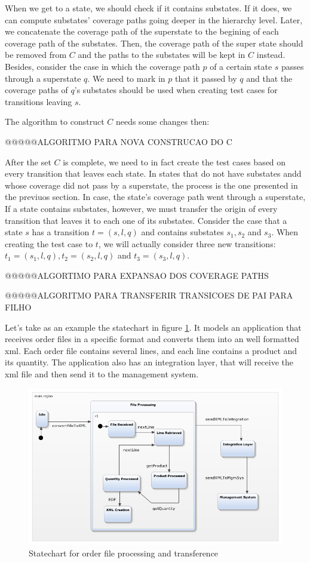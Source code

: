 When we get to a state, we should check if it contains substates. If it does, we can compute substates' coverage paths going deeper in the hierarchy level. Later, we concatenate the coverage path of the superstate to the begining of each coverage path of the substates. Then, the coverage path of the super state should be removed from $C$ and the paths to the substates will be kept in $C$ instead. Besides, consider the case in which the coverage path $p$ of a certain state $s$ passes through a superstate $q$. We need to mark in $p$ that it passed by $q$ and that the coverage paths of $q$'s substates should be used when creating test cases for transitions leaving $s$.

The algorithm to construct $C$ needs some changes then:

@@@@@ALGORITMO PARA NOVA CONSTRUCAO DO C 

After the set $C$ is complete, we need to in fact create the test cases based on every transition that leaves each state. In states that do not have substates andd whose coverage did not pass by a superstate, the process is the one presented in the previuos section. In case, the state's coverage path went through a superstate,  If a state contains substates, however, we must transfer the origin of every transition that leaves it to each one of its substates. Consider the case that a state $s$ has a transition $t = (s,l,q)$ and contains substates $s_1, s_2$ and $s_3$. When creating the test case to $t$, we will actually consider three new transitions: $t_1 = (s_1,l,q), t_2 = (s_2,l,q)$ and $t_3 = (s_3,l,q)$. 

@@@@@ALGORTIMO PARA EXPANSAO DOS COVERAGE PATHS

@@@@@ALGORITMO PARA TRANSFERIR TRANSICOES DE PAI PARA FILHO

Let's take as an example the statechart in figure \ref{fig:webEDI}. It models an application that receives order files in a specific format and converts them into an well formatted xml. Each order file contains several lines, and each line contains a product and its quantity. The application also has an integration layer, that will receive the xml file and then send it to the management system.

\begin{figure}[htb]
\centering
\includegraphics[width=15cm]{figuras/webEDI}
\caption{\label{fig:webEDI} Statechart for order file processing and transference}
\end{figure}


